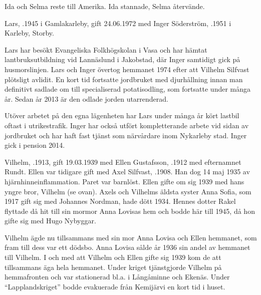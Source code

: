 Ida och Selma reste till Amerika. Ida stannade, Selma återvände.





Lars, .1945 i Gamlakarleby, gift 24.06.1972 med Inger Söderström, .1951 i Karleby, Storby.
\begin{jhchildren}
  \item {}
  \item {}
  \item {}
\end{jhchildren}
Lars har besökt Evangeliska Folkhögskolan i Vasa och har hämtat lantbruksutbildning vid Lannäslund i Jakobstad, där Inger samtidigt gick på husmorslinjen. Lars och Inger övertog hemmanet 1974 efter att Vilhelm Silfvast plötsligt avlidit. En kort tid fortsatte jordbruket med djurhållning innan man definitivt sadlade om till specialiserad potatisodling, som  fortsatte under många år. Sedan år 2013  är den odlade jorden utarrenderad.

Utöver arbetet på den egna lägenheten har Lars under många år kört lastbil oftast i utrikestrafik. Inger har också utfört kompletterande arbete vid sidan av jordbruket och har haft fast tjänst som närvårdare inom Nykarleby stad. Inger gick i pension 2014.


Vilhelm, .1913, gift 19.03.1939 med Ellen Gustafsson, .1912 med efternamnet Rundt. Ellen var tidigare gift med Axel Silfvast, .1908. Han dog 14 maj 1935 av hjärnhinneinflammation. Paret var barnlöst. Ellen gifte om sig 1939 med hans yngre bror, Vilhelm (se ovan). Axels och Vilhelms äldsta syster Anna Sofia, som 1917 gift sig med Johannes Nordman, hade dött 1934. Hennes dotter Rakel flyttade då hit till sin mormor Anna Lovisas hem och bodde här till 1945, då hon gifte sig med Hugo Nybyggar.

Vilhelm ägde nu tillsammans med sin mor Anna Lovisa och Ellen hemmanet, som fram till dess var ett dödsbo. Anna Lovisa sålde år 1936 sin andel av hemmanet till Vilhelm. I och med att Vilhelm och Ellen gifte sig 1939 kom de att tillsammans äga hela hemmanet. Under kriget tjänstgjorde Vilhelm på hemmafronten och var stationerad bl.a. i Långåminne och Ekenäs. Under ``Lapplandskriget'' bodde evakuerade från Kemijärvi en kort tid i huset.

